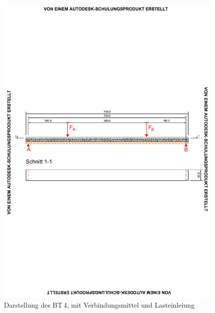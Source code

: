 \begin{figure}[h!]
\begin{center}
\includegraphics[scale =0.9,trim= 1.5cm 10cm 1.5cm 10cm, clip=true]{Auswertung/4versuch/BT4.pdf}
\caption{Darstellung des BT\,4, mit Verbindungsmittel und Lasteinleiung}
\label{1versuch}
\end{center}
\end{figure}



